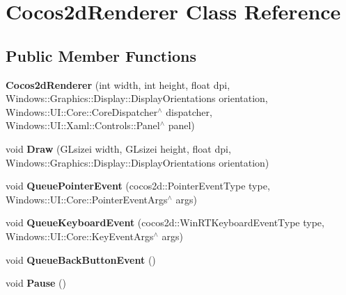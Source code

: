 \hypertarget{classCocos2dRenderer}{}\section{Cocos2d\+Renderer Class Reference}
\label{classCocos2dRenderer}
\subsection*{Public Member Functions}
\begin{DoxyCompactItemize}
\item 
\mbox{\label{classCocos2dRenderer_aebeabf98d4e38453f7b0037f1696298e}} 
{\bfseries Cocos2d\+Renderer} (int width, int height, float dpi, Windows\+::\+Graphics\+::\+Display\+::\+Display\+Orientations orientation, Windows\+::\+U\+I\+::\+Core\+::\+Core\+Dispatcher$^\wedge$ dispatcher, Windows\+::\+U\+I\+::\+Xaml\+::\+Controls\+::\+Panel$^\wedge$ panel)
\item 
\mbox{\label{classCocos2dRenderer_a189eebc46e0296e668d284291833a882}} 
void {\bfseries Draw} (G\+Lsizei width, G\+Lsizei height, float dpi, Windows\+::\+Graphics\+::\+Display\+::\+Display\+Orientations orientation)
\item 
\mbox{\label{classCocos2dRenderer_a18483fe8392de98f6eb608d34a4f9a65}} 
void {\bfseries Queue\+Pointer\+Event} (cocos2d\+::\+Pointer\+Event\+Type type, Windows\+::\+U\+I\+::\+Core\+::\+Pointer\+Event\+Args$^\wedge$ args)
\item 
\mbox{\label{classCocos2dRenderer_ae8bb09c38904a2658c75ab5e6d0ed224}} 
void {\bfseries Queue\+Keyboard\+Event} (cocos2d\+::\+Win\+R\+T\+Keyboard\+Event\+Type type, Windows\+::\+U\+I\+::\+Core\+::\+Key\+Event\+Args$^\wedge$ args)
\item 
\mbox{\label{classCocos2dRenderer_a4c81bf54ee380343b7646e4f65583e58}} 
void {\bfseries Queue\+Back\+Button\+Event} ()
\item 
\mbox{\label{classCocos2dRenderer_aade59afd80ea1bcfb353b67bcf76831d}} 
void {\bfseries Pause} ()
\item 
\mbox{\label{classCocos2dRenderer_ac8016f2e5b35c0bf1e6c2dfe4d076394}} 

\end{DoxyCompactItemize}
